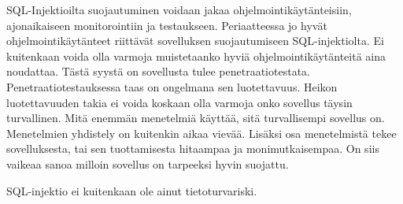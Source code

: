 \documentclass[finnish]{tktltiki2}
\theoremstyle{definition}
\theoremstyle{remark}
\begin{document}
	
	SQL-Injektioilta suojautuminen voidaan jakaa ohjelmointikäytänteisiin, ajonaikaiseen monitorointiin ja testaukseen. Periaatteessa jo hyvät ohjelmointikäytänteet riittävät sovelluksen suojautumiseen SQL-injektiolta. Ei kuitenkaan voida olla varmoja muistetaanko hyviä ohjelmointikäytänteitä aina noudattaa. Tästä syystä on sovellusta tulee penetraatiotestata.
	Penetraatiotestauksessa taas on ongelmana sen luotettavuus. Heikon luotettavuuden takia ei voida koskaan olla varmoja onko sovellus täysin turvallinen. Mitä enemmän menetelmiä käyttää, sitä turvallisempi sovellus on. Menetelmien yhdistely on kuitenkin aikaa vievää. Lisäksi osa menetelmistä tekee sovelluksesta, tai sen tuottamisesta hitaampaa ja monimutkaisempaa. On siis vaikeaa sanoa milloin sovellus on tarpeeksi hyvin suojattu.
	
	SQL-injektio ei kuitenkaan ole ainut tietoturvariski.
	
	\pagebreak
	
	
	
	
	
	
	
	
	
	
	
	
	
\end{document}
